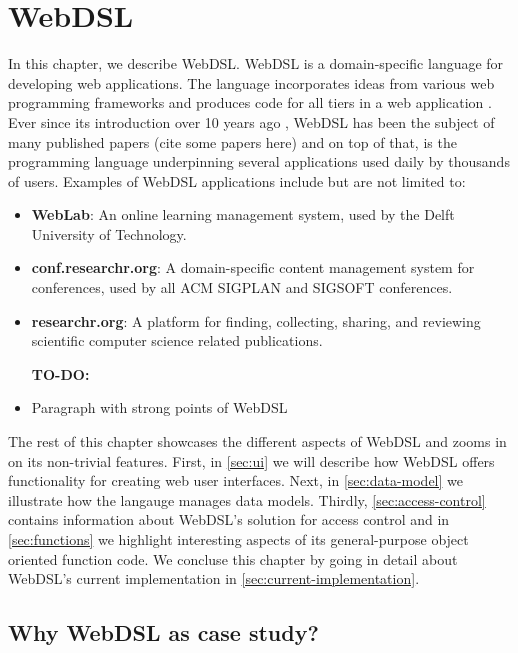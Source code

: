 
\chapter{\label{chap:webdsl}WebDSL}

  In this chapter, we describe WebDSL. WebDSL is a domain-specific language for developing web applications. The language incorporates ideas from various web programming frameworks and produces code for all tiers in a web application \autocite{Groenewegen2020}. Ever since its introduction over 10 years ago \autocite{Visser2007}, WebDSL has been the subject of many published papers (cite some papers here) and on top of that, is the programming language underpinning several applications used daily by thousands of users. Examples of WebDSL applications include but are not limited to:
  \begin{itemize}
    \item \textbf{WebLab}: An online learning management system, used by the Delft University of Technology.
    \item \textbf{conf.researchr.org}: A domain-specific content management system for conferences, used by all ACM SIGPLAN and SIGSOFT conferences.
    \item \textbf{researchr.org}: A platform for finding, collecting, sharing, and reviewing scientific computer science related publications.
  \end{itemize}

  \begin{itemize}
    \item [\textbf{TO-DO:}]
    \item Paragraph with strong points of WebDSL
  \end{itemize}

  The rest of this chapter showcases the different aspects of WebDSL and zooms in on its non-trivial features. First, in \cref{sec:ui} we will describe how WebDSL offers functionality for creating web user interfaces. Next, in \cref{sec:data-model} we illustrate how the langauge manages data models. Thirdly, \cref{sec:access-control} contains information about WebDSL's solution for access control and in \cref{sec:functions} we highlight interesting aspects of its general-purpose object oriented function code. We concluse this chapter by going in detail about WebDSL's current implementation in \cref{sec:current-implementation}.

  \section{\label{sec:why-webdsl}Why WebDSL as case study?}

